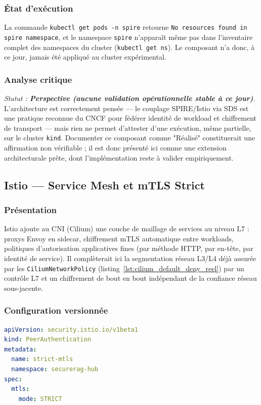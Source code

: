 \subsubsection{État d'exécution}
La commande \texttt{kubectl get pods -n spire} retourne \texttt{No resources found in spire namespace}, et le namespace \texttt{spire} n'apparaît même pas dans l'inventaire complet des namespaces du cluster (\texttt{kubectl get ns}). Le composant n'a donc, à ce jour, jamais été appliqué au cluster expérimental.

\subsubsection{Analyse critique}
\textit{Statut : \textbf{Perspective (aucune validation opérationnelle stable à ce jour)}.} L'architecture est correctement pensée — le couplage SPIRE/Istio via SDS est une pratique reconnue du CNCF pour fédérer identité de workload et chiffrement de transport — mais rien ne permet d'attester d'une exécution, même partielle, sur le cluster \texttt{kind}. Documenter ce composant comme "Réalisé" constituerait une affirmation non vérifiable ; il est donc présenté ici comme une extension architecturale prête, dont l'implémentation reste à valider empiriquement.

\subsection{Istio — Service Mesh et mTLS Strict}
\label{subsec:istio_v2}

\subsubsection{Présentation}
Istio ajoute au CNI (Cilium) une couche de maillage de services au niveau L7 : proxys Envoy en sidecar, chiffrement mTLS automatique entre workloads, politiques d'autorisation applicatives fines (par méthode HTTP, par en-tête, par identité de service). Il complèterait ici la segmentation réseau L3/L4 déjà assurée par les \texttt{CiliumNetworkPolicy} (listing~\ref{lst:cilium_default_deny_reel}) par un contrôle L7 et un chiffrement de bout en bout indépendant de la confiance réseau sous-jacente.

\subsubsection{Configuration versionnée}
\begin{lstlisting}[language=yaml, caption={Extrait réel de la PeerAuthentication Istio en mode STRICT (\texttt{infra/k8s/istio/peerauthentication-strict.yaml})}, label={lst:istio_peerauth_reel}]
apiVersion: security.istio.io/v1beta1
kind: PeerAuthentication
metadata:
  name: strict-mtls
  namespace: securerag-hub
spec:
  mtls:
    mode: STRICT
\end{lstlisting}

